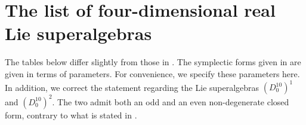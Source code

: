 \documentclass[12pt]{amsart}
\begin{document}
\section{The list of four-dimensional real Lie superalgebras}
The tables below differ slightly from those in \cite{BM}. The symplectic forms given in \cite{BM} are given in terms of parameters. For convenience, we specify these  parameters here. In addition, we correct the statement regarding the Lie superalgebras $(D_0^{10})^1$ and $(D_0^{10})^2$. The two admit both an odd and an even non-degenerate closed form, contrary to what is stated in \cite{BM}.
\footnotesize
\end{document}
